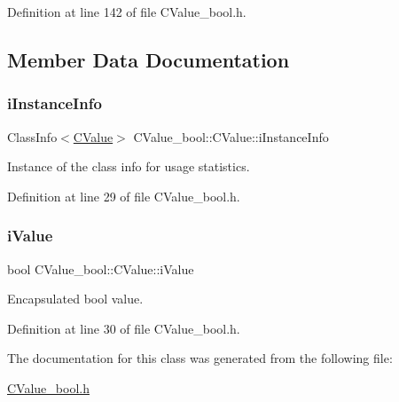 Definition at line 142 of file C\+Value\+\_\+bool.\+h.



\subsection{Member Data Documentation}
\mbox{\label{class_c_value__bool_1_1_c_value_a5e9470a5efc80373b5cc943f25d1a803}} 
\subsubsection{\texorpdfstring{i\+Instance\+Info}{iInstanceInfo}}
{\footnotesize\ttfamily Class\+Info$<$\hyperlink{class_c_value__bool_1_1_c_value}{C\+Value}$>$ C\+Value\+\_\+bool\+::\+C\+Value\+::i\+Instance\+Info\hspace{0.3cm}{\ttfamily [private]}}



Instance of the class info for usage statistics. 



Definition at line 29 of file C\+Value\+\_\+bool.\+h.

\mbox{\label{class_c_value__bool_1_1_c_value_a2a05b9efee1e0497a631a39b0146b776}} 
\subsubsection{\texorpdfstring{i\+Value}{iValue}}
{\footnotesize\ttfamily bool C\+Value\+\_\+bool\+::\+C\+Value\+::i\+Value\hspace{0.3cm}{\ttfamily [private]}}



Encapsulated {\ttfamily bool} value. 



Definition at line 30 of file C\+Value\+\_\+bool.\+h.



The documentation for this class was generated from the following file\+:\begin{DoxyCompactItemize}
\item 
\hyperlink{_c_value__bool_8h}{C\+Value\+\_\+bool.\+h}\end{DoxyCompactItemize}
